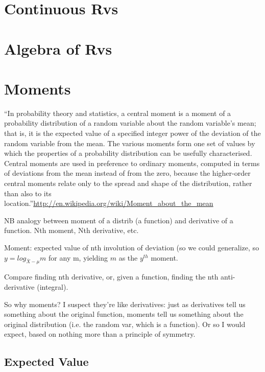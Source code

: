 \section{Continuous Rvs}

\section{Algebra of Rvs}

\section{Moments}

``In probability theory and statistics, a central moment is a moment of a probability distribution of a random variable about the random variable's mean; that is, it is the expected value of a specified integer power of the deviation of the random variable from the mean. The various moments form one set of values by which the properties of a probability distribution can be usefully characterised. Central moments are used in preference to ordinary moments, computed in terms of deviations from the mean instead of from the zero, because the higher-order central moments relate only to the spread and shape of the distribution, rather than also to its location.''\url{http://en.wikipedia.org/wiki/Moment_about_the_mean}

\begin{remark}
  NB analogy between moment of a distrib (a function) and derivative
  of a function.  Nth moment, Nth derivative, etc.

  Moment: expected value of nth involution of deviation (so we could
  generalize, so $y = log_{\bar{X}-\mu} m$ for any m, yielding $m$ as
  the $y^{th}$ moment.

  Compare finding nth derivative, or, given a function, finding the
  nth anti-derivative (integral).

  So why moments?  I suspect they're like derivatives: just as
  derivatives tell us something about the original function, moments
  tell us something about the original distribution (i.e. the random
  var, which is a function).  Or so I would expect, based on nothing
  more than a principle of symmetry.
\end{remark}

\subsection{Expected Value}


